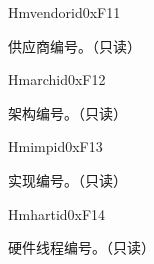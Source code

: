 
\begin{register}{H}{mvendorid}{0xF11}\label{regdesc:MVENDORID}
%
\regnewline%
\begin{regdesc}\begin{reglist}
\label{fielddesc:MVENDORID}\item [MVENDORID] 供应商编号。（只读）
\end{reglist}\end{regdesc}
\end{register}

\begin{register}{H}{marchid}{0xF12}\label{regdesc:MARCHID}
%
\regnewline%
\begin{regdesc}\begin{reglist}
\label{fielddesc:MARCHID}\item [MARCHID] 架构编号。（只读）
\end{reglist}\end{regdesc}
\end{register}

\begin{register}{H}{mimpid}{0xF13}\label{regdesc:MIMPID}
%
\regnewline%
\begin{regdesc}\begin{reglist}
\label{fielddesc:MIMPID}\item [MIMPID] 实现编号。（只读）
\end{reglist}\end{regdesc}
\end{register}

\begin{register}{H}{mhartid}{0xF14}\label{regdesc:MHARTID}
%
\regnewline%
\begin{regdesc}\begin{reglist}
\label{fielddesc:MHARTID}\item [MHARTID] 硬件线程编号。（只读）
\end{reglist}\end{regdesc}
\end{register}

